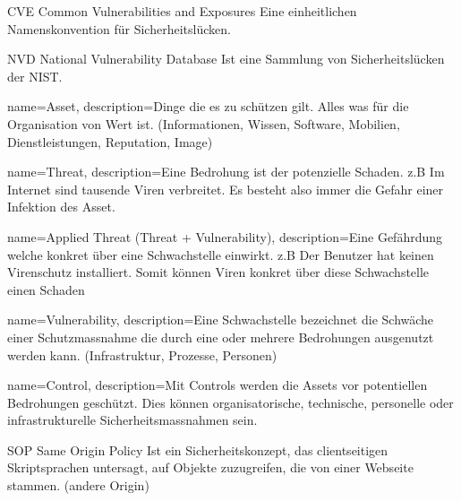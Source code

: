 {CVE}
{Common Vulnerabilities and Exposures}
{
	Eine einheitlichen Namenskonvention für Sicherheitslücken.
}

{NVD}
{National Vulnerability Database}
{
	Ist eine Sammlung von Sicherheitslücken der NIST.
}



{
	name={Asset},
	description={Dinge die es zu schützen gilt. Alles was für die Organisation von Wert ist. (Informationen, Wissen, Software, Mobilien, Dienstleistungen, Reputation, Image)
	}
}

{
	name={Threat},
	description={Eine Bedrohung ist der potenzielle Schaden. z.B Im Internet sind tausende Viren verbreitet. Es besteht also immer die Gefahr einer Infektion des Asset.
	}
}

{
	name={Applied Threat (Threat + Vulnerability)},
	description={Eine Gefährdung welche konkret über eine Schwachstelle einwirkt. z.B Der Benutzer hat keinen Virenschutz installiert. Somit können Viren konkret über diese Schwachstelle einen Schaden}
}

{
	name={Vulnerability},
	description={Eine Schwachstelle bezeichnet die Schwäche einer Schutzmassnahme die durch eine oder mehrere Bedrohungen ausgenutzt werden kann. (Infrastruktur, Prozesse, Personen)
	}
}

{
	name={Control},
	description={Mit Controls werden die Assets vor potentiellen Bedrohungen geschützt. Dies können organisatorische, technische, personelle oder infrastrukturelle Sicherheitsmassnahmen sein.
	}
}

{SOP}
{Same Origin Policy}
{
	Ist ein Sicherheitskonzept, das clientseitigen Skriptsprachen untersagt, auf Objekte zuzugreifen, die von einer Webseite stammen. (andere Origin)
}